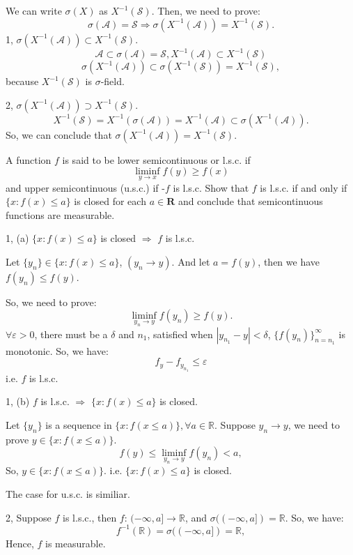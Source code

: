 \documentclass[en, normal, 11pt, black]{elegantnote}
\newenvironment{exercise}[1]{\begin{tcolorbox}[colback=black!15, colframe=black!80, breakable, title=#1]}{\end{tcolorbox}}
\renewenvironment{proof}{\begin{tcolorbox}[colback=white, colframe=black!50, breakable, title=Proof. ]\setlength{\parskip}{0.8em}}{\\\rightline{$\square$}\end{tcolorbox}}
\newenvironment{solution}{\begin{tcolorbox}[colback=white, colframe=black!50, breakable, title=Solution. ]\setlength{\parskip}{0.8em}}{\end{tcolorbox}}
\begin{document}
    \begin{proof}
        We can write $\sigma(X)$ as $X^{-1}(\mathcal{S})$. Then, we need to prove: 
        \[\sigma(\mathcal{A})=\mathcal{S}\Rightarrow \sigma(X^{-1}(\mathcal{A}))=X^{-1}(\mathcal{S}). \]
        1, $\sigma(X^{-1}(\mathcal{A}))\subset X^{-1}(\mathcal{S})$. 
        \[\mathcal{A}\subset\sigma(\mathcal{A})=\mathcal{S}, X^{-1}(\mathcal{A})\subset X^{-1}(\mathcal{S})\]
        \[\sigma(X^{-1}(\mathcal{A}))\subset \sigma(X^{-1}(\mathcal{S}))=X^{-1}(\mathcal{S}), \]
        because $X^{-1}(\mathcal{S})$ is $\sigma$-field. 

        2, $\sigma(X^{-1}(\mathcal{A}))\supset X^{-1}(\mathcal{S})$. 
        \[X^{-1}(\mathcal{S})=X^{-1}(\sigma(\mathcal{A}))=X^{-1}(\mathcal{A})\subset\sigma(X^{-1}(\mathcal{A})). \]
        So, we can conclude that $\sigma(X^{-1}(\mathcal{A}))=X^{-1}(\mathcal{S})$. 
    \end{proof}

    \begin{exercise}{1.3.5}
        A function $f$ is said to be lower semicontinuous or l.s.c. if
        $$
        \liminf _{y \rightarrow x} f(y) \geq f(x)
        $$
        and upper semicontinuous (u.s.c.) if -$f$ is l.s.c. Show that $f$ is l.s.c. if and only if $\{x: f(x) \leq a\}$ is closed for each $a \in \mathbf{R}$ and conclude that semicontinuous functions are measurable.
    \end{exercise}

    \begin{solution}
        1, (a) $\{x: f(x) \leq a\}$ is closed $\Rightarrow$ $f$ is l.s.c. 

        Let $\{y_n\}\in\{x:f(x)\leqslant a\}$, $(y_n \to y)$. And let $a=f(y)$, then we have $f(y_n)\leqslant f(y)$. 

        So, we need to prove: 
        \[\liminf_{y_n\to y}f(y_n)\geqslant f(y). \]
        $\forall \varepsilon>0$, there must be a $\delta$ and $n_1$, satisfied when $|y_{n_1}-y|<\delta$, $\{f(y_n)\}_{n=n_1}^\infty$ is monotonic. So, we have: 
        \[f_y-f_{y_{n_1}}\leqslant \varepsilon\]
        i.e. $f$ is l.s.c. 

        1, (b) $f$ is l.s.c. $\Rightarrow$ $\{x: f(x) \leq a\}$ is closed. 

        Let $\{y_n\}$ is a sequence in $\{x:f(x\leqslant a)\}, \forall a\in\mathbb{R}$. Suppose $y_n\to y$, we need to prove $y\in\{x:f(x\leqslant a)\}$. 
        \[f(y)\leqslant\liminf_{y_n\to y}f(y_n)<a, \]
        So, $y\in\{x:f(x\leqslant a)\}$. i.e. $\{x: f(x) \leq a\}$ is closed. 
        
        The case for u.s.c. is similiar. 

        2, Suppose $f$ is l.s.c., then $f:\,(-\infty, a]\to \mathbb{R}$, and $\sigma((-\infty,a])=\mathbb{R}$. So, we have: 
        \[f^{-1}(\mathbb{R})=\sigma((-\infty,a])=\mathbb{R}, \]
        Hence, $f$ is measurable. 
    \end{solution}
    
\end{document}
